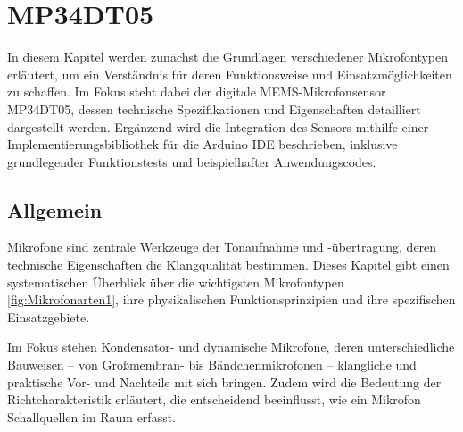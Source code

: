 %
%

\chapter{MP34DT05} \label{MP34DT05}

In diesem Kapitel werden zunächst die Grundlagen verschiedener Mikrofontypen erläutert, um ein Verständnis für deren Funktionsweise und Einsatzmöglichkeiten zu schaffen. Im Fokus steht dabei der digitale MEMS-Mikrofonsensor MP34DT05, dessen technische Spezifikationen und Eigenschaften detailliert dargestellt werden. Ergänzend wird die Integration des Sensors mithilfe einer Implementierungsbibliothek für die Arduino IDE beschrieben, inklusive grundlegender Funktionstests und beispielhafter Anwendungscodes.


\section{Allgemein} \label{MP34DT05-Allgemein}

Mikrofone sind zentrale Werkzeuge der Tonaufnahme und -übertragung, deren technische Eigenschaften die Klangqualität bestimmen. Dieses Kapitel gibt einen systematischen Überblick über die wichtigsten Mikrofontypen \ref{fig:Mikrofonarten1}, ihre physikalischen Funktionsprinzipien und ihre spezifischen Einsatzgebiete.

\bigskip

Im Fokus stehen Kondensator- und dynamische Mikrofone, deren unterschiedliche Bauweisen – von Großmembran- bis Bändchenmikrofonen – klangliche und praktische Vor- und Nachteile mit sich bringen. Zudem wird die Bedeutung der Richtcharakteristik erläutert, die entscheidend beeinflusst, wie ein Mikrofon Schallquellen im Raum erfasst.

